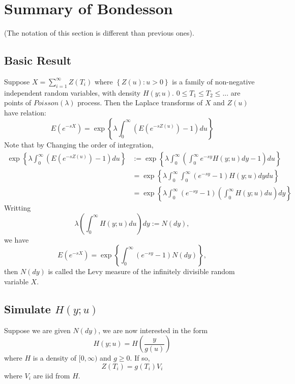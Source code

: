 \documentclass[11pt, oneside]{article}
\begin{document}
\section{Summary of Bondesson}
(The notation of this section is different than previous ones).
\subsection{Basic Result}
Suppose $X = \sum_{i=1}^\infty Z(T_i)$ where  $\left\{Z(u): u>0\right\}$ is a family of non-negative independent random variables, with density $H(y; u)$.  $0 \leq T_1 \leq T_2 \leq ...$ are points of $Poisson(\lambda)$ process. Then the Laplace transforms of $X$ and $Z(u)$ have relation:
\begin{equation}
E(e^{-sX}) = \exp\left\{\lambda \int_0^\infty \left(E(e^{-sZ(u)}) -1\right) du \right\}
\end{equation}
Note that by Changing the order of integration,
\begin{align}
\exp\left\{\lambda \int_0^\infty \left(E(e^{-sZ(u)}) -1\right) du \right\} &:= \exp\left\{\lambda \int_0^\infty \left(\int_0^\infty e^{-sy}H(y; u)dy  -1\right) du \right\}\\
&= \exp\left\{\lambda \int_0^\infty\int_0^\infty  \left(e^{-sy}-1 \right)H(y; u) dy  du \right\}\\
&= \exp\left\{\lambda \int_0^\infty\left(e^{-sy}-1 \right)\left( \int_0^\infty  H(y; u) du \right) dy \right\}
\end{align}
Writting
\begin{equation}\label{levy}
\lambda \left(\int_0^\infty  H(y; u) du\right) dy := N(dy), 
\end{equation}
we have
\begin{equation}
E(e^{-sX}) = \exp\left\{  \int_0^\infty\left(e^{-sy}-1 \right)  N(dy)\right\},
\end{equation}
then $N(dy)$ is called the Levy measure of the infinitely divisible random variable $X$.

\subsection{Simulate $H(y; u)$}
Suppose we are given $N(dy)$, we are now interested in the form $$H(y; u) = H\left(\frac{y}{g(u)}\right)$$
where $H$ is a density of $[0,\infty)$ and $g\geq 0$. If so, 
$$
Z(T_i) = g(T_i)V_i
$$
where $V_i$ are iid from $H$.\\
\end{document}
